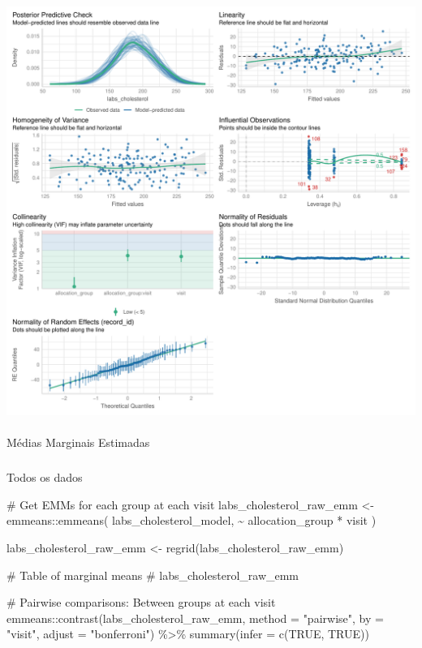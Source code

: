 \documentclass[
  12pt,
]{article}
\makeatletter
\let\oldparagraph\paragraph
\renewcommand{\paragraph}{
    \@ifstar
      \xxxParagraphStar
      \xxxParagraphNoStar
  }
\newcommand{\xxxParagraphStar}[1]{\oldparagraph*{#1}\mbox{}}
\newcommand{\xxxParagraphNoStar}[1]{\oldparagraph{#1}\mbox{}}
\let\oldsubparagraph\subparagraph
\renewcommand{\subparagraph}{
    \@ifstar
      \xxxSubParagraphStar
      \xxxSubParagraphNoStar
  }
\newcommand{\xxxSubParagraphStar}[1]{\oldsubparagraph*{#1}\mbox{}}
\newcommand{\xxxSubParagraphNoStar}[1]{\oldsubparagraph{#1}\mbox{}}
\newenvironment{Shaded}{\begin{snugshade}}{\end{snugshade}}
\newcommand{\AttributeTok}[1]{\textcolor[rgb]{0.40,0.45,0.13}{#1}}
\newcommand{\CommentTok}[1]{\textcolor[rgb]{0.37,0.37,0.37}{#1}}
\newcommand{\ConstantTok}[1]{\textcolor[rgb]{0.56,0.35,0.01}{#1}}
\newcommand{\FunctionTok}[1]{\textcolor[rgb]{0.28,0.35,0.67}{#1}}
\newcommand{\NormalTok}[1]{\textcolor[rgb]{0.00,0.23,0.31}{#1}}
\newcommand{\OtherTok}[1]{\textcolor[rgb]{0.00,0.23,0.31}{#1}}
\newcommand{\SpecialCharTok}[1]{\textcolor[rgb]{0.37,0.37,0.37}{#1}}
\newcommand{\StringTok}[1]{\textcolor[rgb]{0.13,0.47,0.30}{#1}}
\makeatother
\begin{document}
\includegraphics{Outcomes_files/figure-pdf/labs_cholesterol_4-2.pdf}

\paragraph{Médias Marginais
Estimadas}\label{muxe9dias-marginais-estimadas-4}

\subparagraph{Todos os dados}\label{todos-os-dados-4}

\begin{Shaded}
\begin{Highlighting}[]
\CommentTok{\# Get EMMs for each group at each visit}
\NormalTok{labs\_cholesterol\_raw\_emm }\OtherTok{\textless{}{-}}\NormalTok{ emmeans}\SpecialCharTok{::}\FunctionTok{emmeans}\NormalTok{(}
\NormalTok{    labs\_cholesterol\_model, }
    \SpecialCharTok{\textasciitilde{}}\NormalTok{ allocation\_group }\SpecialCharTok{*}\NormalTok{ visit}
\NormalTok{)}

\NormalTok{labs\_cholesterol\_raw\_emm }\OtherTok{\textless{}{-}} \FunctionTok{regrid}\NormalTok{(labs\_cholesterol\_raw\_emm)}

\CommentTok{\# Table of marginal means}
\CommentTok{\# labs\_cholesterol\_raw\_emm}

\CommentTok{\# Pairwise comparisons: Between groups at each visit}
\NormalTok{emmeans}\SpecialCharTok{::}\FunctionTok{contrast}\NormalTok{(labs\_cholesterol\_raw\_emm,}
\AttributeTok{method =} \StringTok{"pairwise"}\NormalTok{, }\AttributeTok{by =} \StringTok{"visit"}\NormalTok{,}
\AttributeTok{adjust =} \StringTok{"bonferroni"}\NormalTok{) }\SpecialCharTok{\%\textgreater{}\%} \FunctionTok{summary}\NormalTok{(}\AttributeTok{infer =} \FunctionTok{c}\NormalTok{(}\ConstantTok{TRUE}\NormalTok{, }\ConstantTok{TRUE}\NormalTok{))}
\end{Highlighting}
\end{Shaded}
\end{document}
